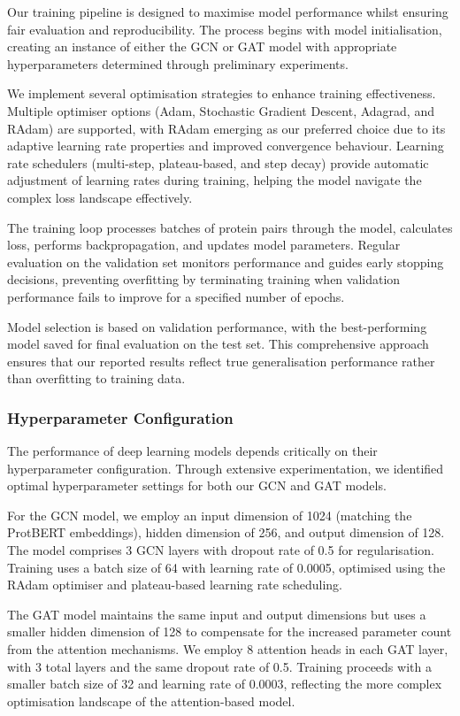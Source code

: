 \documentclass[12pt,a4paper]{article}
\begin{document}
Our training pipeline is designed to maximise model performance whilst ensuring fair evaluation and reproducibility. The process begins with model initialisation, creating an instance of either the GCN or GAT model with appropriate hyperparameters determined through preliminary experiments.

We implement several optimisation strategies to enhance training effectiveness. Multiple optimiser options (Adam, Stochastic Gradient Descent, Adagrad, and RAdam) are supported, with RAdam emerging as our preferred choice due to its adaptive learning rate properties and improved convergence behaviour. Learning rate schedulers (multi-step, plateau-based, and step decay) provide automatic adjustment of learning rates during training, helping the model navigate the complex loss landscape effectively.

The training loop processes batches of protein pairs through the model, calculates loss, performs backpropagation, and updates model parameters. Regular evaluation on the validation set monitors performance and guides early stopping decisions, preventing overfitting by terminating training when validation performance fails to improve for a specified number of epochs.

Model selection is based on validation performance, with the best-performing model saved for final evaluation on the test set. This comprehensive approach ensures that our reported results reflect true generalisation performance rather than overfitting to training data.

\subsubsection{Hyperparameter Configuration}

The performance of deep learning models depends critically on their hyperparameter configuration. Through extensive experimentation, we identified optimal hyperparameter settings for both our GCN and GAT models.

For the GCN model, we employ an input dimension of 1024 (matching the ProtBERT embeddings), hidden dimension of 256, and output dimension of 128. The model comprises 3 GCN layers with dropout rate of 0.5 for regularisation. Training uses a batch size of 64 with learning rate of 0.0005, optimised using the RAdam optimiser and plateau-based learning rate scheduling.

The GAT model maintains the same input and output dimensions but uses a smaller hidden dimension of 128 to compensate for the increased parameter count from the attention mechanisms. We employ 8 attention heads in each GAT layer, with 3 total layers and the same dropout rate of 0.5. Training proceeds with a smaller batch size of 32 and learning rate of 0.0003, reflecting the more complex optimisation landscape of the attention-based model.
\end{document}
